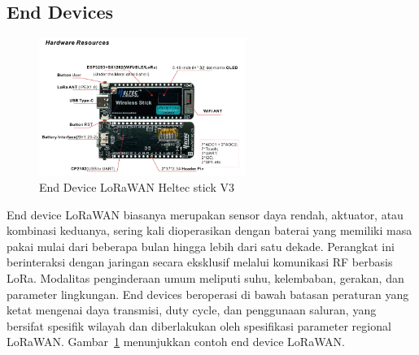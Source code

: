 \subsection{End Devices}
\begin{figure}
    \centering
    \includegraphics[width=0.6\textwidth]{figures/stick_v3.png}
    \caption{End Device LoRaWAN Heltec stick V3}
    \label{fig:lora_end_device}
\end{figure}
End device LoRaWAN biasanya merupakan sensor daya rendah, aktuator, atau kombinasi keduanya, sering kali dioperasikan dengan baterai yang memiliki masa pakai mulai dari beberapa bulan hingga lebih dari satu dekade. Perangkat ini berinteraksi dengan jaringan secara eksklusif melalui komunikasi RF berbasis LoRa. Modalitas penginderaan umum meliputi suhu, kelembaban, gerakan, dan parameter lingkungan. End devices beroperasi di bawah batasan peraturan yang ketat mengenai daya transmisi, duty cycle, dan penggunaan saluran, yang bersifat spesifik wilayah dan diberlakukan oleh spesifikasi parameter regional LoRaWAN.
Gambar~\ref{fig:lora_end_device} menunjukkan contoh end device LoRaWAN.
